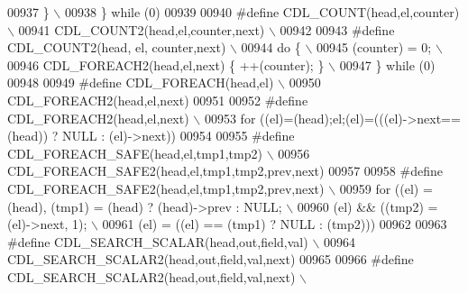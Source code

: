 \begin{DoxyCode}
00937 \textcolor{preprocessor}{  \}                                                                                            \(\backslash\)}
00938 \textcolor{preprocessor}{\} while (0)}
00939 
00940 \textcolor{preprocessor}{#define CDL\_COUNT(head,el,counter)                                                             \(\backslash\)}
00941 \textcolor{preprocessor}{    CDL\_COUNT2(head,el,counter,next)                                                           \(\backslash\)}
00942 \textcolor{preprocessor}{}
00943 \textcolor{preprocessor}{#define CDL\_COUNT2(head, el, counter,next)                                                     \(\backslash\)}
00944 \textcolor{preprocessor}{do \{                                                                                           \(\backslash\)}
00945 \textcolor{preprocessor}{  (counter) = 0;                                                                               \(\backslash\)}
00946 \textcolor{preprocessor}{  CDL\_FOREACH2(head,el,next) \{ ++(counter); \}                                                  \(\backslash\)}
00947 \textcolor{preprocessor}{\} while (0)}
00948 
00949 \textcolor{preprocessor}{#define CDL\_FOREACH(head,el)                                                                   \(\backslash\)}
00950 \textcolor{preprocessor}{    CDL\_FOREACH2(head,el,next)}
00951 
00952 \textcolor{preprocessor}{#define CDL\_FOREACH2(head,el,next)                                                             \(\backslash\)}
00953 \textcolor{preprocessor}{    for ((el)=(head);el;(el)=(((el)->next==(head)) ? NULL : (el)->next))}
00954 
00955 \textcolor{preprocessor}{#define CDL\_FOREACH\_SAFE(head,el,tmp1,tmp2)                                                    \(\backslash\)}
00956 \textcolor{preprocessor}{    CDL\_FOREACH\_SAFE2(head,el,tmp1,tmp2,prev,next)}
00957 
00958 \textcolor{preprocessor}{#define CDL\_FOREACH\_SAFE2(head,el,tmp1,tmp2,prev,next)                                         \(\backslash\)}
00959 \textcolor{preprocessor}{  for ((el) = (head), (tmp1) = (head) ? (head)->prev : NULL;                                   \(\backslash\)}
00960 \textcolor{preprocessor}{       (el) && ((tmp2) = (el)->next, 1);                                                       \(\backslash\)}
00961 \textcolor{preprocessor}{       (el) = ((el) == (tmp1) ? NULL : (tmp2)))}
00962 
00963 \textcolor{preprocessor}{#define CDL\_SEARCH\_SCALAR(head,out,field,val)                                                  \(\backslash\)}
00964 \textcolor{preprocessor}{    CDL\_SEARCH\_SCALAR2(head,out,field,val,next)}
00965 
00966 \textcolor{preprocessor}{#define CDL\_SEARCH\_SCALAR2(head,out,field,val,next)                                            \(\backslash\)}

\end{DoxyCode}
